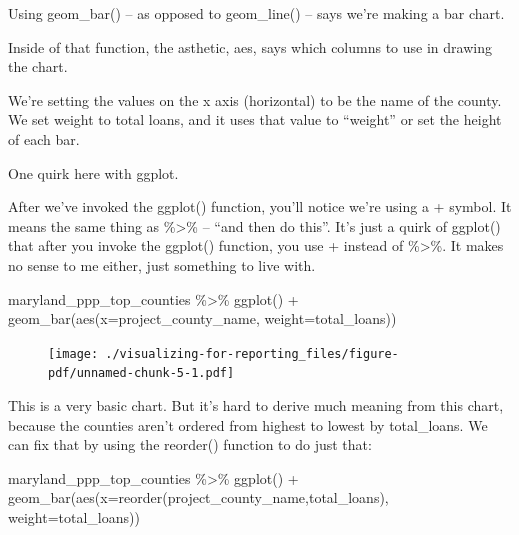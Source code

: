 \documentclass[
  letterpaper,
  DIV=11,
  numbers=noendperiod]{scrreprt}
\newenvironment{Shaded}{\begin{snugshade}}{\end{snugshade}}
\newcommand{\AttributeTok}[1]{\textcolor[rgb]{0.40,0.45,0.13}{#1}}
\newcommand{\FunctionTok}[1]{\textcolor[rgb]{0.28,0.35,0.67}{#1}}
\newcommand{\NormalTok}[1]{\textcolor[rgb]{0.00,0.23,0.31}{#1}}
\newcommand{\SpecialCharTok}[1]{\textcolor[rgb]{0.37,0.37,0.37}{#1}}
\begin{document}
Using geom\_bar() -- as opposed to geom\_line() -- says we're making a
bar chart.

Inside of that function, the asthetic, aes, says which columns to use in
drawing the chart.

We're setting the values on the x axis (horizontal) to be the name of
the county. We set weight to total loans, and it uses that value to
``weight'' or set the height of each bar.

One quirk here with ggplot.

After we've invoked the ggplot() function, you'll notice we're using a +
symbol. It means the same thing as \%\textgreater\% -- ``and then do
this''. It's just a quirk of ggplot() that after you invoke the ggplot()
function, you use + instead of \%\textgreater\%. It makes no sense to me
either, just something to live with.

\begin{Shaded}
\begin{Highlighting}[]
\NormalTok{maryland\_ppp\_top\_counties }\SpecialCharTok{\%\textgreater{}\%}
  \FunctionTok{ggplot}\NormalTok{() }\SpecialCharTok{+}
  \FunctionTok{geom\_bar}\NormalTok{(}\FunctionTok{aes}\NormalTok{(}\AttributeTok{x=}\NormalTok{project\_county\_name, }\AttributeTok{weight=}\NormalTok{total\_loans))}
\end{Highlighting}
\end{Shaded}

\begin{figure}[H]

{\centering \texttt{[image: ./visualizing-for-reporting\_files/figure-pdf/unnamed-chunk-5-1.pdf]}

}

\end{figure}

This is a very basic chart. But it's hard to derive much meaning from
this chart, because the counties aren't ordered from highest to lowest
by total\_loans. We can fix that by using the reorder() function to do
just that:

\begin{Shaded}
\begin{Highlighting}[]
\NormalTok{maryland\_ppp\_top\_counties }\SpecialCharTok{\%\textgreater{}\%}
  \FunctionTok{ggplot}\NormalTok{() }\SpecialCharTok{+}
  \FunctionTok{geom\_bar}\NormalTok{(}\FunctionTok{aes}\NormalTok{(}\AttributeTok{x=}\FunctionTok{reorder}\NormalTok{(project\_county\_name,total\_loans), }\AttributeTok{weight=}\NormalTok{total\_loans))}
\end{Highlighting}
\end{Shaded}
\end{document}

